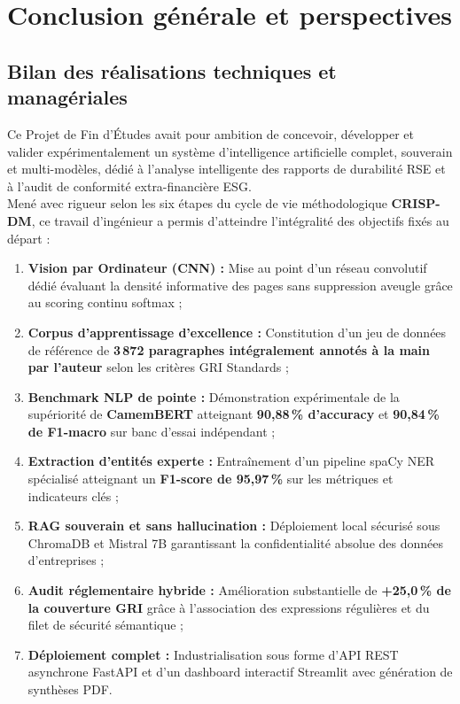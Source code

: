 \documentclass[12pt,a4paper]{report}
\begin{document}
\chapter{Conclusion générale et perspectives}

\section{Bilan des réalisations techniques et managériales}
Ce Projet de Fin d'Études avait pour ambition de concevoir, développer et valider expérimentalement un système d'intelligence artificielle complet, souverain et multi-modèles, dédié à l'analyse intelligente des rapports de durabilité RSE et à l'audit de conformité extra-financière ESG.\\

Mené avec rigueur selon les six étapes du cycle de vie méthodologique \textbf{CRISP-DM}, ce travail d'ingénieur a permis d'atteindre l'intégralité des objectifs fixés au départ :
\begin{enumerate}
    \item \textbf{Vision par Ordinateur (CNN) :} Mise au point d'un réseau convolutif dédié évaluant la densité informative des pages sans suppression aveugle grâce au scoring continu softmax ;
    \item \textbf{Corpus d'apprentissage d'excellence :} Constitution d'un jeu de données de référence de \textbf{3\,872 paragraphes intégralement annotés à la main par l'auteur} selon les critères GRI Standards ;
    \item \textbf{Benchmark NLP de pointe :} Démonstration expérimentale de la supériorité de \textbf{CamemBERT} atteignant \textbf{90,88\,\% d'accuracy} et \textbf{90,84\,\% de F1-macro} sur banc d'essai indépendant ;
    \item \textbf{Extraction d'entités experte :} Entraînement d'un pipeline spaCy NER spécialisé atteignant un \textbf{F1-score de 95,97\,\%} sur les métriques et indicateurs clés ;
    \item \textbf{RAG souverain et sans hallucination :} Déploiement local sécurisé sous ChromaDB et Mistral 7B garantissant la confidentialité absolue des données d'entreprises ;
    \item \textbf{Audit réglementaire hybride :} Amélioration substantielle de \textbf{+25,0\,\% de la couverture GRI} grâce à l'association des expressions régulières et du filet de sécurité sémantique ;
    \item \textbf{Déploiement complet :} Industrialisation sous forme d'API REST asynchrone FastAPI et d'un dashboard interactif Streamlit avec génération de synthèses PDF.
\end{enumerate}
\end{document}
